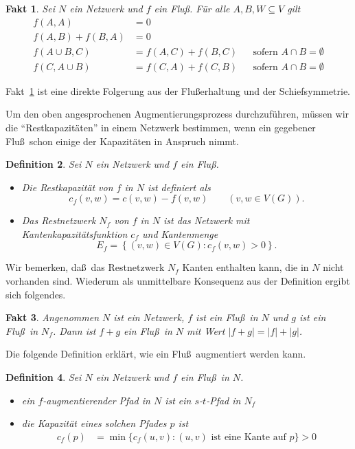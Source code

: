 \documentclass[10pt,reqno]{amsart}
\numberwithin{equation}{section}
\newcommand\alert[1]{\emph{#1}}
\newtheorem{definition}{Definition}[section]
\newtheorem{fact}[definition]{Fakt}
\newcommand\cbc[1]{\left\{{#1}\right\}}
\begin{document}
\begin{fact}\label{lem_flow}
	Sei $N$ ein Netzwerk und $f$ ein Flu\ss.
	F\"ur alle $A,B,W\subseteq V$ gilt
	\begin{align*}
		f(A,A)&=0\\
		f(A,B)+f(B,A)&=0\\
		f(A\cup B,C)&=f(A,C)+f(B,C)&&\mbox{sofern }A\cap B=\emptyset\\
		f(C,A\cup B)&=f(C,A)+f(C,B)&&\mbox{sofern }A\cap B=\emptyset
	\end{align*}
\end{fact}

\noindent
Fakt~\ref{lem_flow} ist eine direkte Folgerung aus der Flu\ss erhaltung und der Schiefsymmetrie.

Um den oben angesprochenen Augmentierungsprozess durchzuf\"uhren, m\"ussen wir die ``Restkapazit\"aten'' in einem Netzwerk bestimmen, wenn ein gegebener Flu\ss\ schon einige der Kapazit\"aten in Anspruch nimmt.

\begin{definition}\label{def_remflow}
	Sei $N$ ein Netzwerk und $f$ ein Flu\ss.
	\begin{itemize}
		\item Die \alert{Restkapazit\"at} von $f$ in $N$ ist definiert als
			$$c_f(v,w)=c(v,w)-f(v,w)\qquad(v,w\in V(G)).$$
		\item Das \alert{Restnetzwerk} $N_f$ von $f$ in $N$ ist das Netzwerk mit Kantenkapazit\"atsfunktion $c_f$ und Kantenmenge
			$$E_f=\cbc{(v,w)\in V(G):c_f(v,w)>0}.$$
	\end{itemize}
\end{definition}

Wir bemerken, da\ss\ das Restnetzwerk $N_f$ Kanten enthalten kann, die in $N$ nicht vorhanden sind.
Wiederum als unmittelbare Konsequenz aus der Definition ergibt sich folgendes.

\begin{fact}\label{lem_remflow}
	Angenommen $N$ ist ein Netzwerk, $f$ ist ein Flu\ss\ in $N$ und $g$ ist ein Flu\ss\ in $N_f$.
	Dann ist $f+g$ ein Flu\ss\ in $N$ mit Wert $|f+g|=|f|+|g|$.
\end{fact}

Die folgende Definition erkl\"art, wie ein Flu\ss\ augmentiert werden kann.

\begin{definition}\label{def_aug}
	Sei $N$ ein Netzwerk und $f$ ein Flu\ss\ in $N$.
	\begin{itemize}
		\item ein \alert{$f$-augmentierender Pfad} in $N$ ist ein $s$-$t$-Pfad in $N_f$
		\item die \alert{Kapazit\"at} eines solchen Pfades $p$ ist
			\begin{align*}
				c_f(p)&=\min\{c_f(u,v):(u,v)\mbox{ ist eine Kante auf }p\}>0
			\end{align*}
	\end{itemize}
\end{definition}
\end{document}
